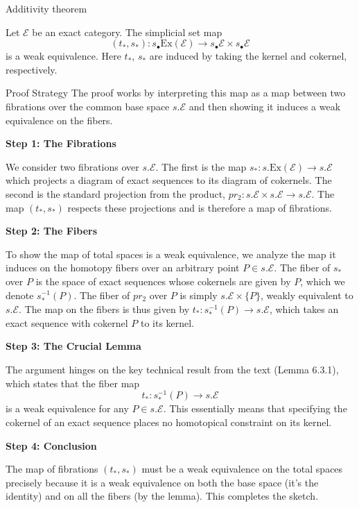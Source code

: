 \documentclass[10pt]{beamer}
\begin{document}
\begin{frame}{Additivity theorem}
	
	
	
	\begin{theorem}
		\label{thm:Additivity_manual_proper_no_id_cmd_generic_label_v2}
		Let $\mathcal{E}$ be an exact category. The simplicial set map
		\[ (t_*, s_*) : s_{\bullet}\mathrm{Ex}(\mathcal{E}) \to s_{\bullet}\mathcal{E} \times s_{\bullet}\mathcal{E} \]
		is a weak equivalence. Here $t_*$, $s_*$ are induced by taking the kernel and cokernel, respectively.
	\end{theorem}
	
	\begin{alertblock}{Proof Strategy}
		The proof works by interpreting this map as a map between two fibrations over the common base space $s.\mathcal{E}$ and then showing it induces a weak equivalence on the fibers.
	\end{alertblock}
	
	\textbf{Step 1: The Fibrations}
	
	We consider two fibrations over $s.\mathcal{E}$. The first is the map $s_*: s.\mathrm{Ex}(\mathcal{E}) \to s.\mathcal{E}$ which projects a diagram of exact sequences to its diagram of cokernels. The second is the standard projection from the product, $pr_2: s.\mathcal{E} \times s.\mathcal{E} \to s.\mathcal{E}$. The map $(t_*, s_*)$ respects these projections and is therefore a map of fibrations.
	
	\textbf{Step 2: The Fibers}
	
	To show the map of total spaces is a weak equivalence, we analyze the map it induces on the homotopy fibers over an arbitrary point $P \in s.\mathcal{E}$. The fiber of $s_*$ over $P$ is the space of exact sequences whose cokernels are given by $P$, which we denote $s_*^{-1}(P)$. The fiber of $pr_2$ over $P$ is simply $s.\mathcal{E} \times \{P\}$, weakly equivalent to $s.\mathcal{E}$. The map on the fibers is thus given by $t_*: s_*^{-1}(P) \to s.\mathcal{E}$, which takes an exact sequence with cokernel $P$ to its kernel.
	
	\textbf{Step 3: The Crucial Lemma}
	
	The argument hinges on the key technical result from the text (Lemma 6.3.1), which states that the fiber map
	\[ t_*: s_*^{-1}(P) \longrightarrow s.\mathcal{E} \]
	is a weak equivalence for any $P \in s.\mathcal{E}$. This essentially means that specifying the cokernel of an exact sequence places no homotopical constraint on its kernel.
	
	\textbf{Step 4: Conclusion}
	
	The map of fibrations $(t_*, s_*)$ must be a weak equivalence on the total spaces precisely because it is a weak equivalence on both the base space (it's the identity) and on all the fibers (by the lemma). This completes the sketch.
	

\end{frame}
\end{document}
